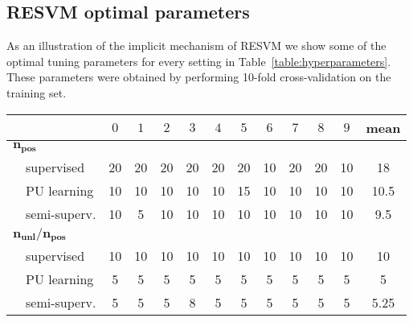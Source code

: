 \documentclass[preprint,elsarticle-num,12pt]{elsarticle}
\begin{document}

\subsection{RESVM optimal parameters}
As an illustration of the implicit mechanism of RESVM we show some of the optimal tuning parameters for every setting in Table~\ref{table:hyperparameters}. These parameters were obtained by performing 10-fold cross-validation on the training set. 

\begin{table}[!h]
\centering
\begin{tabular}{lccccccccccc}
\toprule
 & $0$ & $1$ & $2$ & $3$ & $4$ & $5$ & $6$ & $7$ & $8$ & $9$ & mean \\
\midrule
$\mathbf{n_{pos}}$ \\
\ \ supervised &   20 &   20 &   20 &   20 &   20 &   20 &   10 &   20 &   20 &   10 &   18 \\
\ \ PU learning &   10 &   10 &   10 &   10 &   10 &   15 &   10 &   10 &   10 &   10 &   10.5 \\
\ \ semi-superv. &   10 &    5 &   10 &   10 &   10 &   10 &   10 &   10 &   10 &   10 &   9.5 \\
$\mathbf{n_{unl}/n_{pos}}$ \\
\ \ supervised  &   10 &   10 &   10 &   10 &   10 &   10 &   10 &   10 &   10 &   10 &   10 \\
\ \ PU learning &    5 &    5 &    5 &    5 &    5 &    5 &    5 &    5 &    5 &    5 &    5 \\
\ \ semi-superv.  &    5 &    5 &    5 &    8 &    5 &    5 &    5 &    5 &    5 &    5 & 5.25  \\

\end{tabular}
\end{table}
\end{document}
